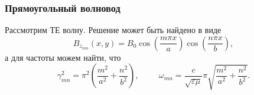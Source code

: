 \subsubsection*{Прямоугольный волновод}

Рассмотрим ТЕ волну. 
Решение может быть найдено в виде
\begin{equation}
    B_{z_{nm}} (x, y) = B_0 \cos \left(
        \frac{m \pi x}{a} 
    \right) \cos \left(
        \frac{n\pi x}{b} 
    \right),
\end{equation}
а для частоты можем найти, что
\begin{equation}
    \gamma^2_{mn} = \pi^2  \left(
        \frac{m^2}{a^2} + \frac{n^2}{b^2} 
    \right),
    \hspace{1cm} 
    \omega_{mn} = \frac{c}{\sqrt{\varepsilon \mu}} \pi \sqrt{
    \frac{m^2}{a^2} + \frac{n^2}{b^2} 
    }.
\end{equation}